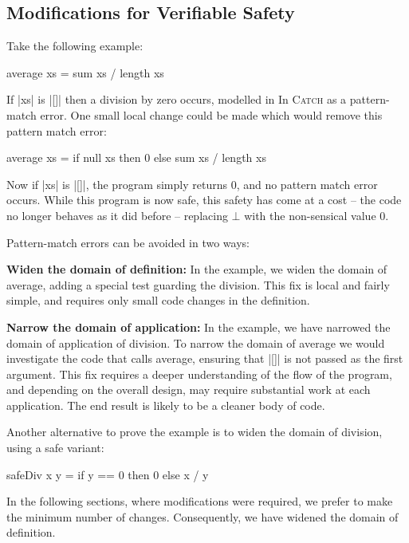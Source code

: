 \documentclass[preprint]{sigplanconf}
\newcommand{\C}[1]{\textsf{#1}}
\newcommand{\catch}{\textsc{Catch}}
\newcommand{\para}[1]{\vspace{2mm}\noindent\textbf{#1}}
\begin{document}
\subsection{Modifications for Verifiable Safety}
\label{sec:safety}

Take the following example:

\begin{code}
average xs = sum xs / length xs
\end{code}

If |xs| is |[]| then a division by zero occurs, modelled in  In \catch{} as a pattern-match error. One small local change could be made which would remove this pattern match error:

\begin{code}
average xs = if null xs then 0 else sum xs / length xs
\end{code}

Now if |xs| is |[]|, the program simply returns 0, and no pattern match error occurs. While this program is now safe, this safety has come at a cost -- the code no longer behaves as it did before -- replacing $\bot{}$ with the non-sensical value 0.

Pattern-match errors can be avoided in two ways:

\para{Widen the domain of definition:} In the example, we widen the domain of \C{average}, adding a special test guarding the division. This fix is local and fairly simple, and requires only small code changes in the definition.

\para{Narrow the domain of application:} In the example, we have narrowed the domain of application of division. To narrow the domain of \C{average} we would investigate the code that calls \C{average}, ensuring that |[]| is not passed as the first argument. This fix requires a deeper understanding of the flow of the program, and depending on the overall design, may require substantial work at each application. The end result is likely to be a cleaner body of code.

Another alternative to prove the example is to widen the domain of division, using a safe variant:

\begin{code}
safeDiv x y = if y == 0 then 0 else x / y
\end{code}

In the following sections, where modifications were required, we prefer to make the minimum number of changes. Consequently, we have widened the domain of definition.
\end{document}
